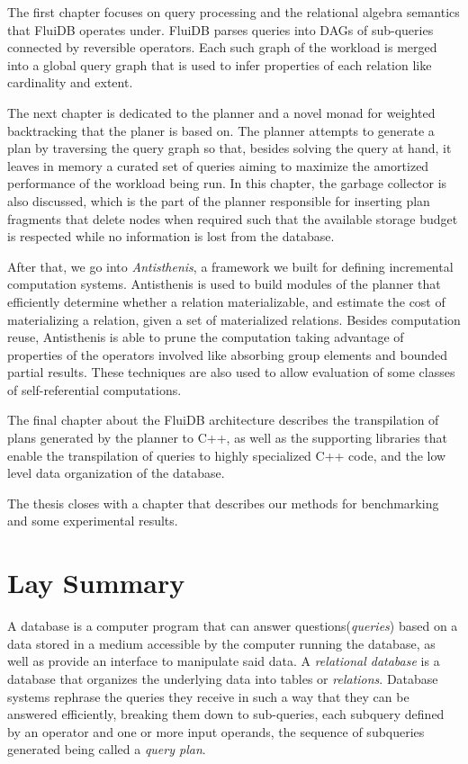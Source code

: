 \begin{precontent}
The first chapter focuses on query processing and the relational algebra semantics that FluiDB operates under. FluiDB parses queries into DAGs of sub-queries connected by reversible operators. Each such graph of the workload is merged into a global query graph that is used to infer properties of each relation like cardinality and extent.

The next chapter is dedicated to the planner and a novel monad for weighted backtracking that the planer is based on. The planner attempts to generate a plan by traversing the query graph so that, besides solving the query at hand, it leaves in memory a curated set of queries aiming to maximize the amortized performance of the workload being run. In this chapter, the garbage collector is also discussed, which is the part of the planner responsible for inserting plan fragments that delete nodes when required  such that the available storage budget is respected while no information is lost from the database.

After that, we go into \emph{Antisthenis}, a framework we built for defining incremental computation systems. Antisthenis is used to build modules of the planner that efficiently determine whether a relation materializable, and estimate the cost of materializing a relation, given a set of materialized relations. Besides computation reuse, Antisthenis is able to prune the computation taking advantage of properties of the operators involved like absorbing group elements  and bounded partial results. These techniques are also used to allow evaluation of some classes of self-referential computations.

The final chapter about the FluiDB architecture describes the transpilation of plans generated by the planner to C++, as well as the supporting libraries that enable the transpilation of queries to highly specialized C++ code, and the low level data organization of the database.

The thesis closes with a chapter that describes our methods for benchmarking and some experimental results.

\chapter{Lay Summary}%

A database is a computer program that can answer questions(\emph{queries}) based on a data stored in a medium accessible by the computer running the database, as well as provide an interface to manipulate said data. A \emph{relational database} is a database that organizes the underlying data into tables or \emph{relations}. Database systems rephrase the queries they receive in such a way that they can be answered efficiently, breaking them down to sub-queries, each subquery defined by an operator and one or more input operands, the sequence of subqueries generated being called a \emph{query plan}.


\end{precontent}
